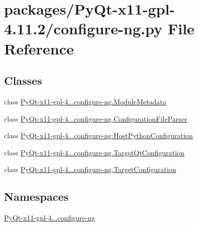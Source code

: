 \hypertarget{configure-ng_8py}{}\section{packages/\+Py\+Qt-\/x11-\/gpl-\/4.11.2/configure-\/ng.py File Reference}
\label{configure-ng_8py}
\subsection*{Classes}
\begin{DoxyCompactItemize}
\item 
class \hyperlink{classPyQt-x11-gpl-4_811_82_1_1configure-ng_1_1ModuleMetadata}{Py\+Qt-\/x11-\/gpl-\/4...\+configure-\/ng.\+Module\+Metadata}
\item 
class \hyperlink{classPyQt-x11-gpl-4_811_82_1_1configure-ng_1_1ConfigurationFileParser}{Py\+Qt-\/x11-\/gpl-\/4...\+configure-\/ng.\+Configuration\+File\+Parser}
\item 
class \hyperlink{classPyQt-x11-gpl-4_811_82_1_1configure-ng_1_1HostPythonConfiguration}{Py\+Qt-\/x11-\/gpl-\/4...\+configure-\/ng.\+Host\+Python\+Configuration}
\item 
class \hyperlink{classPyQt-x11-gpl-4_811_82_1_1configure-ng_1_1TargetQtConfiguration}{Py\+Qt-\/x11-\/gpl-\/4...\+configure-\/ng.\+Target\+Qt\+Configuration}
\item 
class \hyperlink{classPyQt-x11-gpl-4_811_82_1_1configure-ng_1_1TargetConfiguration}{Py\+Qt-\/x11-\/gpl-\/4...\+configure-\/ng.\+Target\+Configuration}
\end{DoxyCompactItemize}
\subsection*{Namespaces}
\begin{DoxyCompactItemize}
\item 
 \hyperlink{namespacePyQt-x11-gpl-4_811_82_1_1configure-ng}{Py\+Qt-\/x11-\/gpl-\/4...\+configure-\/ng}
\end{DoxyCompactItemize}
